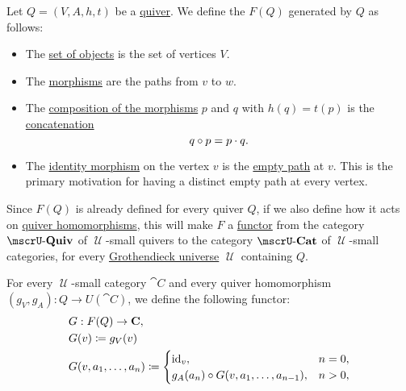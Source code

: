 \begin{definition}\label{def:quiver_free_category}
  Let \( Q = (V, A, h, t) \) be a \hyperref[def:quiver]{quiver}. We define the  \( F(Q) \) generated by \( Q \) as follows:
  \begin{itemize}
    \item The \hyperref[def:category/objects]{set of objects} is the set of vertices \( V \).

    \item The \hyperref[def:category/morphisms]{morphisms} are the paths from \( v \) to \( w \).

    \item The \hyperref[def:category/composition]{composition of the morphisms} \( p \) and \( q \) with \( h(q) = t(p) \) is the \hyperref[def:undirected_multigraph_path/concatenation]{concatenation}
    \begin{equation*}
      q \bincirc p = p \cdot q.
    \end{equation*}

    \item The \hyperref[def:category/identity]{identity morphism} on the vertex \( v \) is the \hyperref[def:undirected_multigraph_path/empty]{empty path} at \( v \). This is the primary motivation for having a distinct empty path at every vertex.
  \end{itemize}

  Since \( F(Q) \) is already defined for every quiver \( Q \), if we also define how it acts on \hyperref[eq:def:category_of_small_quivers/homomorphism]{quiver homomorphisms}, this will make \( F \) a \hyperref[def:functor]{functor} from the category \hyperref[def:category_of_small_quivers]{\( \ucat{Quiv} \)} of \( \mscrU \)-small quivers to the category \hyperref[def:category_of_small_quivers]{\( \ucat{Cat} \)} of \( \mscrU \)-small categories, for every \hyperref[def:grothendieck_universe]{Grothendieck universe} \( \mscrU \) containing \( Q \).

  For every \( \mscrU \)-small category \( \cat{C} \) and every quiver homomorphism \( (g_V, g_A): Q \to U(\cat{C}) \), we define the following functor:
  \begin{equation}\label{eq:def:quiver_free_category/functor_from_homomorphism}
    \begin{aligned}
      &G: F(Q) \to \cat{C}, \\
      &G(v) \coloneqq g_V(v) \\
      &G(v, a_1, \ldots, a_n) \coloneqq \begin{cases}
        \id_v,                                        &n = 0, \\
        g_A(a_n) \bincirc G(v, a_1, \ldots, a_{n-1}), &n > 0,
      \end{cases}
    \end{aligned}
  \end{equation}


\end{definition}
